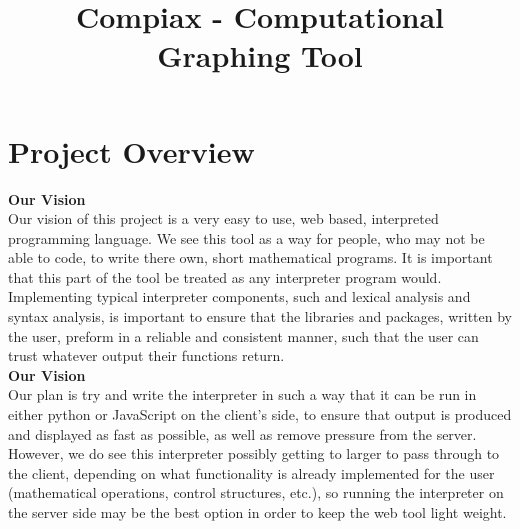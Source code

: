 \documentclass[12pt]{article}
\title{Compiax - Computational Graphing Tool}
\begin{document}
    \newcommand{\titleimage}{compiax.png}
    \newcommand{\titlecompany}{Compiax}
    
    
    
	
	

	\newpage
	\section{Project Overview}

	\textbf{Our Vision}\\
	Our vision of this project is a very easy to use, web based, interpreted programming language. We see this tool as a way for people, 
    who may not be able to code, to write there own, short mathematical programs. It is important that this part of the tool be treated as
    any interpreter program would. Implementing typical interpreter components, such and lexical analysis and syntax analysis, is important
    to ensure that the libraries and packages, written by the user, preform in a reliable and consistent manner, such that the user can 
    trust whatever output their functions return. \\
    
	\textbf{Our Vision}\\    
    Our plan is try and write the interpreter in such a way that it can be run in either python
    or JavaScript on the client's side, to ensure that output is produced and displayed as fast as possible, as well as remove pressure 
    from the server. However, we do see this interpreter possibly getting to larger to pass through to the client, depending on what 
    functionality is already implemented for the user (mathematical operations, control structures, etc.), so running the interpreter on the
    server side may be the best option in order to keep the web tool light weight. \\
\end{document}

